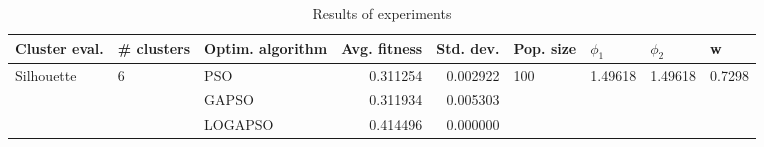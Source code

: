 \begin{table}
\centering
\caption{Results of experiments}
\begin{tabular}{lllrrllll}
\toprule
              Cluster eval. &        \# clusters & Optim. algorithm &  Avg. fitness &  Std. dev. &            Pop. size &               $\phi_{1}$ &               $\phi_{2}$ &                       w \\
\midrule
\multirow{3}{*}{Silhouette} & \multirow{3}{*}{6} &              PSO &      0.311254 &   0.002922 & \multirow{3}{*}{100} & \multirow{3}{*}{1.49618} & \multirow{3}{*}{1.49618} & \multirow{3}{*}{0.7298} \\
                            &                    &            GAPSO &      0.311934 &   0.005303 &                      &                          &                          &                         \\
                            &                    &          LOGAPSO &      0.414496 &   0.000000 &                      &                          &                          &                         \\
\bottomrule
\end{tabular}
\end{table}
